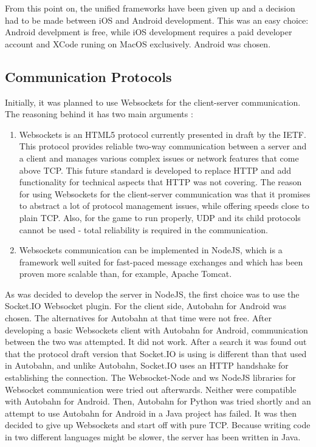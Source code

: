 \documentclass{article}
\begin{document}
From this point on, the unified frameworks have been given up and a decision had
to be made between iOS and Android development. This was an easy choice: Android
develpment is free, while iOS development requires a paid developer account and
XCode runing on MacOS exclusively. Android was chosen.


\subsection{Communication Protocols}

Initially, it was planned to use Websockets for the client-server communication.
The reasoning behind it has two main arguments : 
\begin{enumerate}
  \item Websockets is an HTML5 protocol currently presented in draft by the
  IETF. This protocol provides reliable two-way communication between a server
  and a client and manages various complex issues or network features that come
  above TCP. This future standard is developed to replace HTTP and add
  functionality for technical aspects that HTTP was not covering. The reason for
  using Websockets for the client-server communication was that it promises to
  abstract a lot of protocol management issues, while offering speeds close to
  plain TCP. Also, for the game to run properly, UDP and its child protocols
  cannot be used - total reliability is required in the communication. 
  
  \item Websockets communication can be implemented in NodeJS, which is a
  framework well suited for fast-paced message exchanges and which has been
  proven more scalable than, for example, Apache Tomcat.
\end{enumerate}

As was decided to develop the server in NodeJS, the first choice was to use the
Socket.IO Websocket plugin. For the client side, Autobahn for Android was
chosen. The alternatives for Autobahn at that time were not free. After
developing a basic Websockets client with Autobahn for Android, communication
between the two was attempted. It did not work. After a search it was found out
that the protocol draft version that Socket.IO is using is different than that
used in Autobahn, and unlike Autobahn, Socket.IO uses an HTTP handshake for
establishing the connection. The Websocket-Node and ws NodeJS libraries for
Websocket communication were tried out afterwards. Neither were compatible with
Autobahn for Android. Then, Autobahn for Python was tried shortly and an
attempt to use Autobahn for Android in a Java project has failed. It was then
decided to give up Websockets and start off with pure TCP. Because writing code
in two different languages might be slower, the server has been written in Java.
\end{document}
